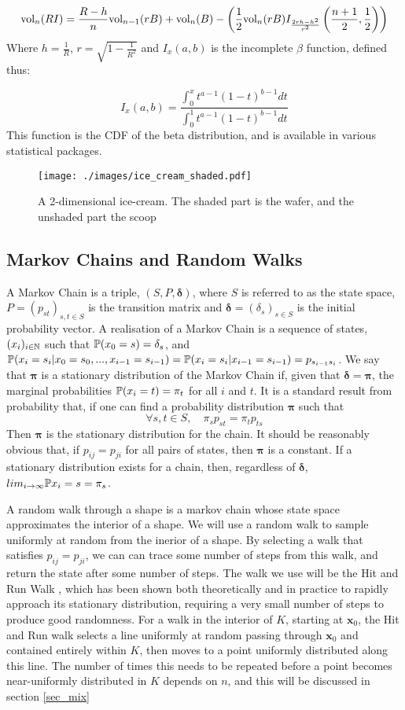 $$
\mbox{vol}_n(RI) = \frac{R-h}{n} \mbox{vol}_{n-1}(rB) + \mbox{vol}_n(B) - \left(\frac{1}{2}\mbox{vol}_n(rB) I_{\frac{2rh-h^2}{r^2}}\left(\frac{n+1}{2}, \frac{1}{2}\right)\right)
$$
Where $h = \frac{1}{R}$, $r = \sqrt{1-\frac{1}{R^2}}$ and $I_x(a,b)$ is the incomplete $\beta$ function, defined thus:

$$
I_x(a,b) = \frac{\int^x_0 t^{a-1}(1-t)^{b-1}dt}{\int^1_0 t^{a-1}(1-t)^{b-1} dt}
$$
This function is the CDF of the beta distribution, and is available in various statistical packages.
\begin{figure}
\centering
\texttt{[image: ./images/ice\_cream\_shaded.pdf]}
\caption{A 2-dimensional ice-cream. The shaded part is the wafer, and the unshaded part the scoop}
\label{fig_ice_cream}
\end{figure}

\subsection{Markov Chains and Random Walks}

A Markov Chain is a triple, $(S,P,\bm{\delta})$, where $S$ is referred to as the state space, $P = (p_{st})_{s,t \in S}$ is the transition matrix and $\bm{\delta} = (\delta_s)_{s \in S}$ is the initial probability vector. A realisation of a Markov Chain is a sequence of states, $(x_i)_{i \in \mathbb{N}}$ such that $\mathbb{P} (x_0 = s)=\delta_s$, and $\mathbb{P}(x_i = s_i | x_0 = s_0, ..., x_{i-1} = s_{i-1}) = \mathbb{P} (x_i = s_i | x_{i-1} = s_{i-1})= p_{s_{i-1}s_{i}}$. We say that $\bm{\pi}$ is a stationary distribution of the Markov Chain if, given that $\bm{\delta} = \bm{\pi}$, the marginal probabilities $\mathbb{P}(x_i = t) = \pi_t$ for all $i$ and $t$.  It is a standard result from probability that, if one can find a probability distribution $\bm{\pi}$ such that
$$
\forall s,t \in S, \quad \pi_s p_{st} = \pi_t p_{ts}
$$
Then $\bm{\pi}$ is the stationary distribution for the chain. It should be reasonably obvious that, if $p_{ij} = p_{ji}$ for all pairs of states, then $\bm{\pi}$ is a constant. If a stationary distribution exists for a chain, then, regardless of $\bm{\delta}$, $lim_{i-> \infty} \mathbb{P} {x_i = s} = \pi_s$.

A random walk through a shape is a markov chain whose state space approximates the interior of a shape. We will use a random walk to sample uniformly at random from the inerior of a shape. By selecting a walk that satisfies $p_{ij} = p_{ji}$, we can can trace some number of steps from this walk, and return the state after some number of steps. The walk we use will be the Hit and Run Walk \cite{Lovasz03a}, which has been shown both theoretically and in practice to rapidly approach its stationary distribution, requiring a very small number of steps to produce good randomness. For a walk in the interior of $K$, starting at $\bm{x}_0$, the Hit and Run walk selects a line uniformly at random passing through $\bm{x}_0$ and contained entirely within $K$, then moves to a point uniformly distributed along this line. The number of times this needs to be repeated before a point becomes near-uniformly distributed in $K$ depends on $n$, and this will be discussed in section \ref{sec_mix}

